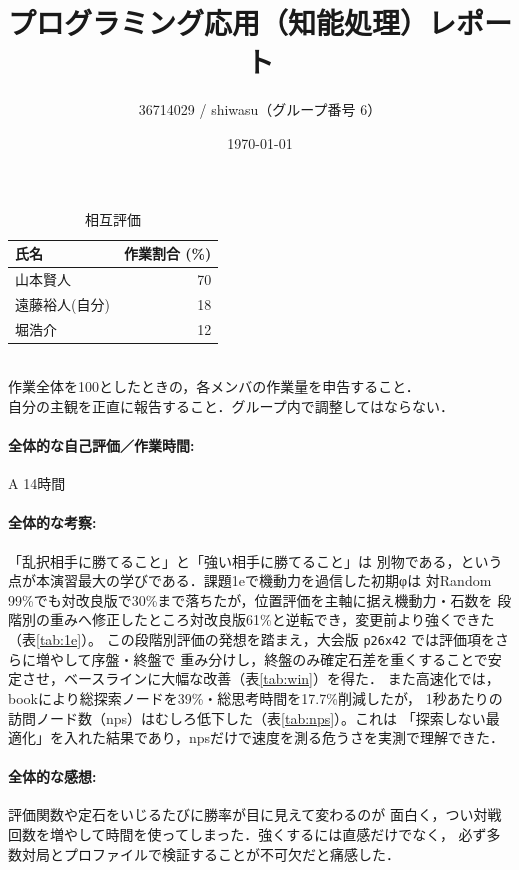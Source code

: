 \documentclass[11pt,a4j]{ujarticle} %
\title{プログラミング応用（知能処理）レポート}
\author{
 36714029 / shiwasu（グループ番号 6）\\
}
\date{\today}
\begin{document}
\maketitle

\begin{table}[h]
\center
\caption{相互評価}
\begin{tabular}{l|r}
氏名 & 作業割合 (\%) \\
\hline \hline
山本賢人 & 70\\
遠藤裕人(自分) & 18 \\
堀浩介 & 12 \\
\end{tabular}
\vspace{1ex}
\\
{\small 作業全体を100としたときの，各メンバの作業量を申告すること．\\
自分の主観を正直に報告すること．グループ内で調整してはならない．}
\end{table}

\paragraph{全体的な自己評価／作業時間: } A  14時間

\paragraph{全体的な考察: } 「乱択相手に勝てること」と「強い相手に勝てること」は
別物である，という点が本演習最大の学びである．課題1eで機動力を過信した初期φは
対Random 99\%でも対改良版で30\%まで落ちたが，位置評価を主軸に据え機動力・石数を
段階別の重みへ修正したところ対改良版61\%と逆転でき，変更前より強くできた（表\ref{tab:1e}）。
この段階別評価の発想を踏まえ，大会版 {\verb+p26x42+} では評価項をさらに増やして序盤・終盤で
重み分けし，終盤のみ確定石差を重くすることで安定させ，ベースラインに大幅な改善（表\ref{tab:win}）を得た．
また高速化では，bookにより総探索ノードを39\%・総思考時間を17.7\%削減したが，
1秒あたりの訪問ノード数（nps）はむしろ低下した（表\ref{tab:nps}）。これは
「探索しない最適化」を入れた結果であり，npsだけで速度を測る危うさを実測で理解できた．

\paragraph{全体的な感想: } 評価関数や定石をいじるたびに勝率が目に見えて変わるのが
面白く，つい対戦回数を増やして時間を使ってしまった．強くするには直感だけでなく，
必ず多数対局とプロファイルで検証することが不可欠だと痛感した．
\end{document}
